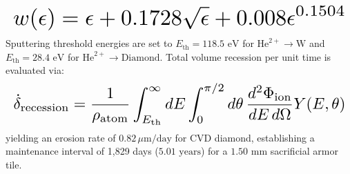 \[
\resizebox{\columnwidth}{!}{$\displaystyle w(\epsilon) = \epsilon + 0.1728 \sqrt{\epsilon} + 0.008 \epsilon^{0.1504}$}
\]
Sputtering threshold energies are set to $E_{\text{th}} = 118.5\text{ eV}$ for $\text{He}^{2+} \to \text{W}$ and $E_{\text{th}} = 28.4\text{ eV}$ for $\text{He}^{2+} \to \text{Diamond}$. Total volume recession per unit time is evaluated via:\[
\resizebox{\columnwidth}{!}{$\displaystyle \dot{\delta}_{\text{recession}} = \frac{1}{\rho_{\text{atom}}} \int_{E_{\text{th}}}^\infty dE \int_0^{\pi/2} d\theta \, \frac{d^2 \Phi_{\text{ion}}}{dE \, d\Omega} Y(E, \theta)$}
\]
yielding an erosion rate of $0.82\,\mu\text{m/day}$ for CVD diamond, establishing a maintenance interval of 1,829 days ($5.01\text{ years}$) for a $1.50\text{ mm}$ sacrificial armor tile.